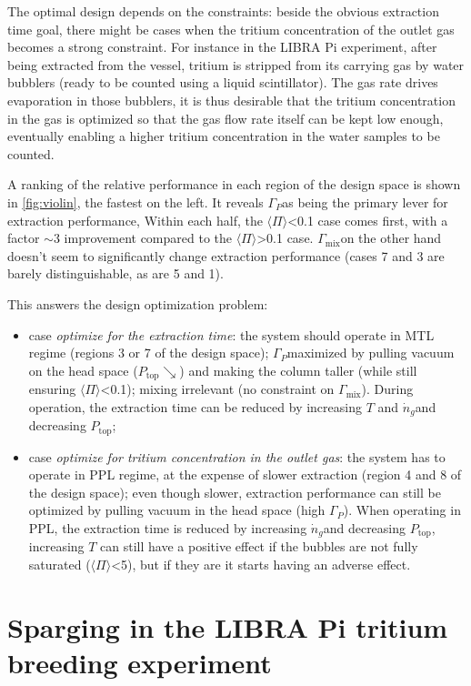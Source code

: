 \documentclass[a4paper,11pt,oneside]{report}
\newcommand{\Gmix}{\ensuremath{\Gamma_\mathrm{mix}}}
\newcommand{\Gp}{\ensuremath{\Gamma_P}}
\newcommand{\PI}{\ensuremath{\langle \Pi \rangle}}
\newcommand{\ndotg}{\ensuremath{\dot n_g}}
\newcommand{\Ptop}{\ensuremath{P_\mathrm{top}}}
\begin{document}
The optimal design depends on the constraints: beside the obvious extraction time goal, there might be cases when the tritium concentration of the outlet gas becomes a strong constraint. For instance in the LIBRA Pi experiment, after being extracted from the vessel, tritium is stripped from its carrying gas by water bubblers (ready to be counted using a liquid scintillator). The gas rate drives evaporation in those bubblers, it is thus desirable that the tritium concentration in the gas is optimized so that the gas flow rate itself can be kept low enough, eventually enabling a higher tritium concentration in the water samples to be counted. 

A ranking of the relative performance in each region of the design space is shown in \cref{fig:violin}, the fastest on the left. It reveals \Gp as being the primary lever for extraction performance, Within each half, the \PI<0.1 case comes first, with a factor $\sim 3$ improvement compared to the \PI>0.1 case. \Gmix on the other hand doesn't seem to significantly change extraction performance (cases 7 and 3 are barely distinguishable, as are 5 and 1). 

This answers the design optimization problem:
\begin{itemize}
    \item  case \textit{optimize for the extraction time}: the system should operate in MTL regime (regions 3 or 7 of the design space); \Gp maximized by pulling vacuum on the head space ($\Ptop \searrow$) and making the column taller (while still ensuring \PI<0.1); mixing irrelevant (no constraint on \Gmix). During operation, the extraction time can be reduced by increasing $T$ and \ndotg and decreasing \Ptop;
    \item case \textit{optimize for tritium concentration in the outlet gas}: the system has to operate in PPL regime, at the expense of slower extraction (region 4 and 8 of the design space); even though slower, extraction performance can still be optimized by pulling vacuum in the head space (high \Gp). When operating in PPL, the extraction time is reduced by increasing \ndotg and decreasing \Ptop, increasing $T$ can still have a positive effect if the bubbles are not fully saturated (\PI<5), but if they are it starts having an adverse effect.
\end{itemize}


\chapter{Sparging in the LIBRA Pi tritium breeding experiment}
\label{sec:LIBRAPi_sparging}
\end{document}
